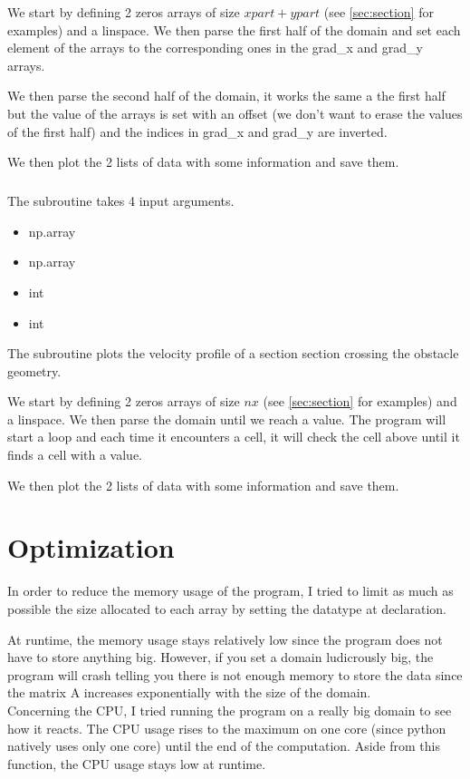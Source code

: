 We start by defining 2 zeros arrays of size $xpart + ypart$ (see
\autoref{sec:section} for examples) and a linspace. We then parse the first
half of the domain and set each element of the arrays to the corresponding ones
in the grad\_x and grad\_y arrays.

We then parse the second half of the domain, it works the same a the first half
but the value of the arrays is set with an offset (we don't want to erase the
values of the first half) and the indices in grad\_x and grad\_y are
inverted.

We then plot the 2 lists of data with some information and save them.

\subsubsection{}
The subroutine \textcolor{func}{} takes 4 input arguments.
\begin{itemize}
      \item {} \textcolor{dtype}{np.array}
      \item {} \textcolor{dtype}{np.array}
      \item {} \textcolor{dtype}{int}
      \item {} \textcolor{dtype}{int}
\end{itemize}
The subroutine plots the velocity profile of a section section crossing the
obstacle geometry.

We start by defining 2 zeros arrays of size $nx$ (see
\autoref{sec:section} for examples) and a linspace. We then parse the domain
until we reach a  value. The program will start a loop and each time
it encounters a  cell, it will check the cell above until it finds
a cell with a  value.

We then plot the 2 lists of data with some information and save them.

\newpage
\part{Optimization}
In order to reduce the memory usage of the program, I tried to limit as much
as possible the size allocated to each array by setting the datatype at
declaration.

At runtime, the memory usage stays relatively low since the program does not
have to store anything big. However, if you set a domain ludicrously big,
the program will crash telling you there is not enough memory to store the data
since the matrix A increases exponentially with the size of the domain.\\
Concerning the CPU, I tried running the program on a really big domain to see
how it reacts. The CPU usage rises to the maximum on one core (since python
natively uses only one core) until the end of the 
computation. Aside from this function, the CPU usage stays low at runtime.

